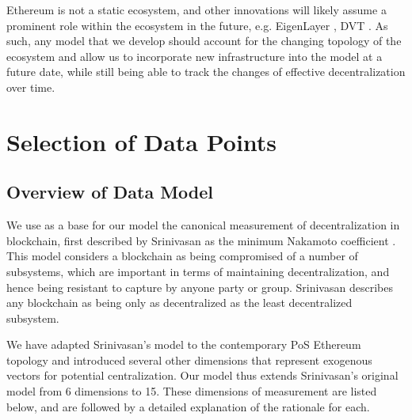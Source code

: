 \documentclass[conference]{IEEEtran}
\begin{document}
Ethereum is not a static ecosystem, and other innovations will likely assume a prominent role within the ecosystem in the future, e.g. EigenLayer \cite{eigenlayer2023}, DVT \cite{asgaonkar-2021}.  As such, any model that we develop should account for the changing topology of the ecosystem and allow us to incorporate new infrastructure into the model at a future date, while still being able to track the changes of effective decentralization over time.

\section{Selection of Data Points}

\subsection{Overview of Data Model}

We use as a base for our model the canonical measurement of decentralization in blockchain, first described by Srinivasan as the minimum Nakamoto coefficient \cite{srinivasan2018}.  This model considers a blockchain as being compromised of a number of subsystems, which are important in terms of maintaining decentralization, and hence being resistant to capture by anyone party or group.  Srinivasan describes any blockchain as being only as decentralized as the least decentralized subsystem. 

We have adapted Srinivasan's model to the contemporary PoS Ethereum topology and introduced several other dimensions that represent exogenous vectors for potential centralization.  Our model thus extends Srinivasan's original model from 6 dimensions to 15.  These dimensions of measurement are listed below, and are followed by a detailed explanation of the rationale for each.
\end{document}
